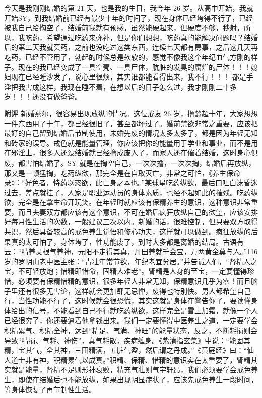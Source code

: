 \begin{case}
    今天是我刚刚结婚的第 21 天，也是我的生日，我今年 26 岁。从高中开始，我就开始SY，到我结婚前已经有最少十年的时间了，现在身体已经垮得不行了，已经被我自己给掏空了，结婚前我就有预感，虽然能硬起来，但硬度不够，秒射，所以，我吃药，希望通过吃药来弥补，但是你们想想，吃药真的能解决问题吗？结婚后的第二天我就买药，之前也没吃过这类东西，连续七天都有房事，之后这几天再吃药，已经不管用了，勃起的时候总是软软的，感觉不像我这个年纪血气方刚的样子。现在的我已经变成了一具空壳、一具尸体，肮脏的发臭的腐烂的尸体！！！媳妇现在已经睡沙发了，说心里很烦，其实谁都能看得出来，我不行！！！ 都是手淫把我害成这样，我现在睡不着，在想以后的日子怎么过，我才刚刚二十多岁！！！还没有做爸爸。

    \textbf{附评} 新婚燕尔，很容易出现放纵的情况。这位戒友 26 岁，撸龄超十年，大家想想一件东西用了十年，都已经很旧了，甚至都坏过了。婚前禁欲非常之重要，应该把最好的自己留到结婚后节制使用，未婚先废的情况太多太多了，都是因为年轻无知和砖家的误导。戒色就是能量管理，你应该把你的能量用于学业和事业，而不是用在邪淫上，很多人还没结婚就已经撸成废人了，而家人还在催着结婚，这时身心俱废，都害怕结婚了。SY 就是在掏空自己，一次次撸，一次次掏，结婚后再放纵，那又是一顿猛掏，吃药纵欲，那完全是在自取灭亡，非常之可怕，《养生保命录》：“好色者，恃药以恣欲，此亡身之本也。”某球星吃药纵欲，最后口吐白沫昏迷过去，差点就挂了，人家是职业运动员的身体素质，也经不起如此的摧残。吃药纵欲，完全是在拿生命开玩笑。在年轻时就应该有保精养生的意识，这种意识非常重要，而且夫妻双方都应该有这个意识，不可在婚后疯狂放纵自己的欲望，应该安排好每月性生活的次数，一般建议三次以内。新婚的话，很难控制，但只要双方取得共识，然后具备较高的戒色养生觉悟和修心功夫，这样就可以做到。疯狂放纵的后果真的太可怕了，身体垮了，性功能废了，到时大多都是离婚的结局。古语有云：“精养灵根气养神，元阳不走得其真，丹田养就千金宝，万两黄金莫与人。”116 岁的罗明山老中医主张：“青壮年常节欲，年纪老宜分居。”并告诫人们，“肾精人之宝，不可轻放炮；惜精即惜命，固精人难老”。肾精是人身的至宝，一定要懂得珍惜，必须要有保精惜精的意识，很多年轻人非常无知，保精意识几乎为零！而且脑子里还有很多无害论，这样就会更加肆无忌惮，废得也特别快。男人都希望自己行，当性功能不行了，这时候就会很恐慌，其实这就是身体在警告你了，要读懂身体给出的信号，不能看到自己不行就吃药纵欲，这样完全是雪上加霜，就像一个人已经很穷了，你还要逼着他拿钱出来。我们一定要懂得中医养生之道，一定要学会积精累气、积精全神，达到“精足、气满、神旺”的能量状态，反之，不断耗损则会导致“精损、气耗、神伤”，真气耗散，疾病缠身。《紫清指玄集》中说：“能固其精，宝其气，全其神，三田精满，五脏气盈，然后谓之丹成。”《黄庭经》曰：“仙人道士非有神，积精累气以成真。”积精、保精、惜精的意识实在太重要了，肾精其实就是能量，肾精不足则形神衰败，精充气壮则气宇轩昂，我们必须要学会戒色养生，即使在结婚后也不能放纵，如果出现明显症状了，应该先戒色养生一段时间，等身体恢复了再节制性生活。
\end{case}

